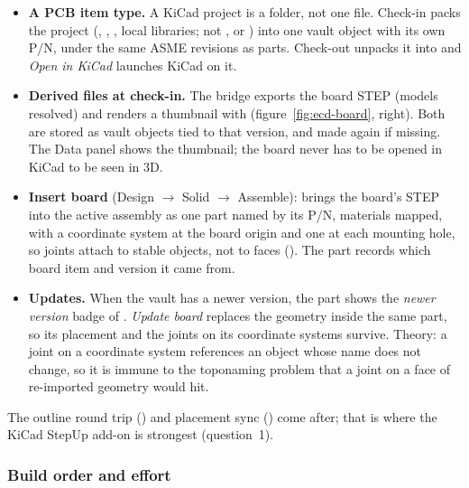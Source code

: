 \begin{itemize}[nosep]
  \item \textbf{A PCB item type.} A KiCad project is a folder, not one file. Check-in packs the project
        (, , , local libraries; not ,
         or ) into one vault object with its own P/N, under the same ASME
        revisions as parts. Check-out unpacks it into  and \emph{Open in KiCad}
        launches KiCad on it.
  \item \textbf{Derived files at check-in.} The bridge exports the board STEP (models resolved) and renders a
        thumbnail with  (figure~\ref{fig:ecd-board}, right). Both are stored as vault
        objects tied to that version, and made again if missing. The Data panel shows the thumbnail; the board
        never has to be opened in KiCad to be seen in 3D.
  \item \textbf{Insert board} (Design $\rightarrow$ Solid $\rightarrow$ Assemble): brings the board's STEP into the
        active assembly as one part named by its P/N, materials mapped, with a coordinate system at the board origin
        and one at each mounting hole, so joints attach to stable objects, not to faces (). The part
        records which board item and version it came from.
  \item \textbf{Updates.} When the vault has a newer version, the part shows the \emph{newer version} badge of
        . \emph{Update board} replaces the geometry inside the same part, so its placement and the
        joints on its coordinate systems survive. Theory: a joint on a coordinate system references an object
        whose name does not change, so it is immune to the toponaming problem that a joint on a face of re-imported
        geometry would hit.
\end{itemize}
The outline round trip () and placement sync () come after; that is where the KiCad StepUp
add-on is strongest (question~1).

\subsubsection*{Build order and effort}

